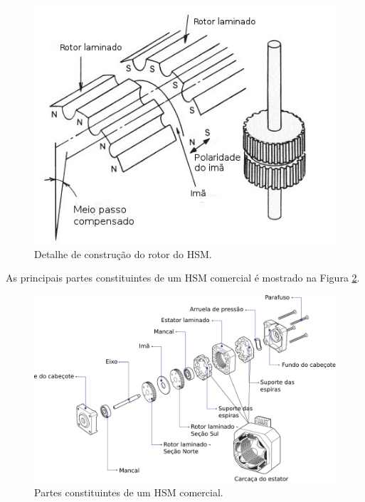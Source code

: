 \begin{figure}[H]
	\centering
	\includegraphics[width = \columnwidth]{Images/VR_ROTOR.jpg}
	\caption{Detalhe de construção do rotor do HSM. \cite{angulo_rotor}}
	\label{fig:HSM_dentes}
\end{figure}

As principais partes constituintes de um HSM comercial é mostrado na Figura \ref{fig:partes_SM}.

\begin{figure}[!t]
	\centering
	\includegraphics[width = .8\textwidth]{Images/partes_HSM.pdf}
	\caption{Partes constituintes de um HSM comercial. \cite{MoonsHSM}}
	\label{fig:partes_SM}
\end{figure}
